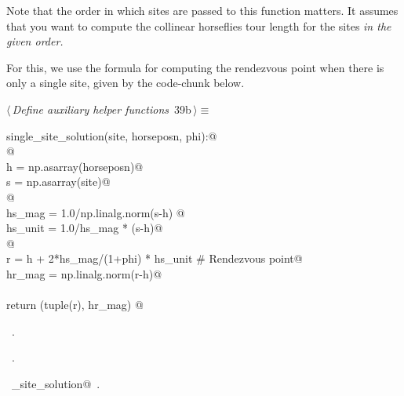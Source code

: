 \documentclass[11.5pt]{report}
\begin{document}
Note that the order in which sites are passed to this function matters. It 
assumes that you want to compute the collinear horseflies tour length for the 
sites \textit{in the given order.} 

For this, we use the formula for computing the rendezvous point when there is 
only a single site, given by the code-chunk below. 


\begin{flushleft} \small\label{scrap42}\raggedright\small
{} $\langle\,${\itshape Define auxiliary helper functions}\nobreak\ {\footnotesize {39b}}$\,\rangle\equiv$
\vspace{-1ex}
\begin{list}{}{} \item
\mbox{}\verb@def single_site_solution(site, horseposn, phi):@\\
\mbox{}\verb@     @\\
\mbox{}\verb@     h = np.asarray(horseposn)@\\
\mbox{}\verb@     s = np.asarray(site)@\\
\mbox{}\verb@     @\\
\mbox{}\verb@     hs_mag  = 1.0/np.linalg.norm(s-h) @\\
\mbox{}\verb@     hs_unit = 1.0/hs_mag * (s-h)@\\
\mbox{}\verb@     @\\
\mbox{}\verb@     r      = h +  2*hs_mag/(1+phi) * hs_unit # Rendezvous point@\\
\mbox{}\verb@     hr_mag = np.linalg.norm(r-h)@\\
\mbox{}\verb@@\\
\mbox{}\verb@     return (tuple(r), hr_mag) @\\
\mbox{}\verb@@{\NWsep}
\end{list}
\vspace{-1.5ex}
\footnotesize
\begin{list}{}{\setlength{\itemsep}{-\parsep}\setlength{\itemindent}{-\leftmargin}}
\item \NWtxtMacroDefBy\ .
\item \NWtxtMacroRefIn\ .
\item \NWtxtIdentsDefed\nobreak\  \verb@single_site_solution@\nobreak\ .
\item{}
\end{list}
\vspace{4ex}
\end{flushleft}
\end{document}
